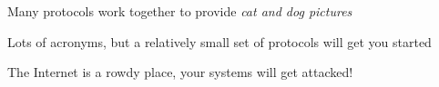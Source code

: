 \documentclass[Screen16to9,17pt]{foils}
\begin{document}





\begin{list2}
\item Many protocols work together to provide \emph{cat and dog pictures}
\item Lots of acronyms, but a relatively small set of protocols will get you started
\item The Internet is a rowdy place, your systems will get attacked!
\end{list2}

\myquestionspage
\end{document}

